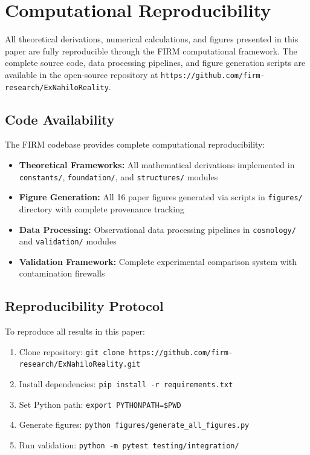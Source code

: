 \documentclass[12pt]{article}
\begin{document}

\section{Computational Reproducibility}

All theoretical derivations, numerical calculations, and figures presented in this paper are fully reproducible through the FIRM computational framework. The complete source code, data processing pipelines, and figure generation scripts are available in the open-source repository at \texttt{https://github.com/firm-research/ExNahiloReality}.

\subsection{Code Availability}

The FIRM codebase provides complete computational reproducibility:

\begin{itemize}
    \item \textbf{Theoretical Frameworks:} All mathematical derivations implemented in \texttt{constants/}, \texttt{foundation/}, and \texttt{structures/} modules
    \item \textbf{Figure Generation:} All 16 paper figures generated via scripts in \texttt{figures/} directory with complete provenance tracking
    \item \textbf{Data Processing:} Observational data processing pipelines in \texttt{cosmology/} and \texttt{validation/} modules
    \item \textbf{Validation Framework:} Complete experimental comparison system with contamination firewalls
\end{itemize}

\subsection{Reproducibility Protocol}

To reproduce all results in this paper:

\begin{enumerate}
    \item Clone repository: \texttt{git clone https://github.com/firm-research/ExNahiloReality.git}
    \item Install dependencies: \texttt{pip install -r requirements.txt}
    \item Set Python path: \texttt{export PYTHONPATH=\$PWD}
    \item Generate figures: \texttt{python figures/generate\_all\_figures.py}
    \item Run validation: \texttt{python -m pytest testing/integration/}
\end{enumerate}
\end{document}
